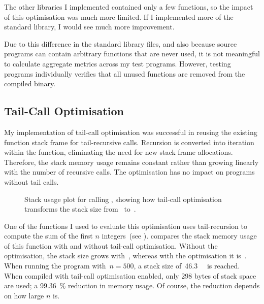 \documentclass[00-main.tex]{subfiles}
\begin{document}
The other libraries I implemented contained only a few functions, so the impact of this optimisation was much more limited.
If I implemented more of the standard library, I would see much more improvement.

Due to this difference in the standard library files, and also because source programs can contain arbitrary functions that are never used, it is not meaningful to calculate aggregate metrics across my test programs.
However, testing programs individually verifies that all unused functions are removed from the compiled binary.

\subsection{Tail-Call Optimisation}\label{sec:eval:tail-call optimisation}

My implementation of tail-call optimisation was successful in reusing the existing function stack frame for tail-recursive calls.
Recursion is converted into iteration within the function, eliminating the need for new stack frame allocations.
Therefore, the stack memory usage remains constant rather than growing linearly with the number of recursive calls.
The optimisation has no impact on programs without tail calls.

\begin{figure}[!b]
  \centering
  \caption{
    Stack usage plot for calling , showing how tail-call optimisation transforms the stack size from~ to~.
  }
  \label{fig:tail-call optimisation stack use} %
\end{figure}

One of the functions I used to evaluate this optimisation uses tail-recursion to compute the sum of the first $n$ integers~(see ).
 compares the stack memory usage of this function with and without tail-call optimisation.
Without the optimisation, the stack size grows with~, whereas with the optimisation it is~.
When running the program with~$n=500$, a stack size of~\SI{46.3}{\kilo\byte} is reached.
When compiled with tail-call optimisation enabled, only 298 bytes of stack space are used; a \SI{99.36}{\percent} reduction in memory usage.
Of course, the reduction depends on how large $n$ is.
\end{document}
